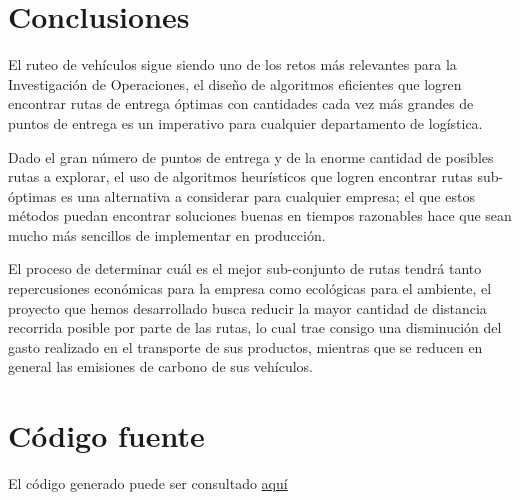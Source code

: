 \documentclass[journal]{IEEEtran}
\begin{document}
    \section{Conclusiones}    
        
        El ruteo de vehículos sigue siendo uno de los retos más relevantes para la Investigación de Operaciones, el diseño de algoritmos eficientes que logren encontrar rutas de entrega óptimas con cantidades cada vez más grandes de puntos de entrega es un imperativo para cualquier departamento de logística.
        
        Dado el gran número de puntos de entrega y de la enorme cantidad de posibles rutas a explorar, el uso de algoritmos heurísticos que logren encontrar rutas sub-óptimas es una alternativa a considerar para cualquier empresa; el que estos métodos puedan encontrar soluciones buenas en tiempos razonables hace que sean mucho más sencillos de implementar en producción.
        
        El proceso de determinar cuál es el mejor sub-conjunto de rutas tendrá tanto repercusiones económicas para la empresa como ecológicas para el ambiente, el proyecto que hemos desarrollado busca reducir la mayor cantidad de distancia recorrida posible por parte de las rutas, lo cual trae consigo una disminución del gasto realizado en el transporte de sus productos, mientras que se reducen en general las emisiones de carbono de sus vehículos.
        
    \appendices
    
    \section{Código fuente}\label{code}
    
        El código generado puede ser consultado \href{https://github.com/JuanEcheagaray75/capacitated-vrp}{aquí}
    
    
    
\end{document}

